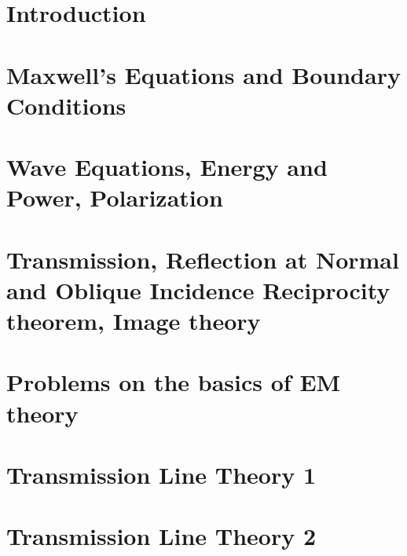 \documentclass[colorlinks,11pt,a4paper,normalphoto,withhyper,ragged2e]{altareport}
\begin{document}
\section{Introduction}



\pagebreak



\section{Maxwell's Equations and Boundary Conditions}



\pagebreak




\section{Wave Equations, Energy and Power, Polarization}



\pagebreak




\section{Transmission, Reflection at Normal and Oblique Incidence Reciprocity theorem, Image theory}



\pagebreak





\section{Problems on the basics of EM theory}



\pagebreak





\section{Transmission Line Theory 1}



\pagebreak



\section{Transmission Line Theory 2}
\end{document}
